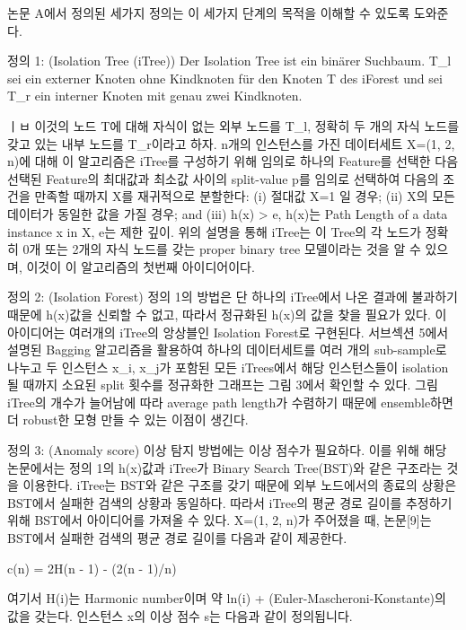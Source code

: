                 논문 A에서 정의된 세가지 정의는 이 세가지 단계의 목적을 이해할 수 있도록 도와준다.

                정의 1: (Isolation Tree (iTree))
                    Der Isolation Tree ist ein binärer Suchbaum. T_l sei ein externer Knoten ohne Kindknoten für den Knoten T des iForest und sei T_r ein interner Knoten mit genau zwei Kindknoten.

                   ㅣㅂ 이것의 노드 T에 대해 자식이 없는 외부 노드를 T_l, 정확히 두 개의 자식 노드를 갖고 있는 내부 노드를 T_r이라고 하자. n개의 인스턴스를 가진 데이터세트 X=(1, 2, n)에 대해 이 알고리즘은 iTree를 구성하기 위해 임의로 하나의 Feature를 선택한 다음 선택된 Feature의 최대값과 최소값 사이의 split-value p를 임의로 선택하여 다음의 조건을 만족할 때까지 X를 재귀적으로 분할한다: (i) 절대값 X=1 일 경우; (ii) X의 모든 데이터가 동일한 값을 가질 경우; and (iii) h(x) > e, h(x)는 Path Length of a data instance x in X, e는 제한 깊이. 위의 설명을 통해 iTree는 이 Tree의 각 노드가 정확히 0개 또는 2개의 자식 노드를 갖는 proper binary tree 모델이라는 것을 알 수 있으며, 이것이 이 알고리즘의 첫번째 아이디어이다.

                정의 2: (Isolation Forest)
                    정의 1의 방법은 단 하나의 iTree에서 나온 결과에 불과하기 때문에 h(x)값을 신뢰할 수 없고, 따라서 정규화된 h(x)의 값을 찾을 필요가 있다. 이 아이디어는 여러개의 iTree의 앙상블인 Isolation Forest로 구현된다. 서브섹션 5에서 설명된 Bagging 알고리즘을 활용하여 하나의 데이터세트를 여러 개의 sub-sample로 나누고 두 인스턴스 x_i, x_j가 포함된 모든 iTrees에서 해당 인스턴스들이 isolation될 때까지 소요된 split 횟수를 정규화한 그래프는 그림 3에서 확인할 수 있다.
                    그림 \cite{Liu08}
                    iTree의 개수가 늘어남에 따라 average path length가 수렴하기 때문에 ensemble하면 더 robust한 모형 만들 수 있는 이점이 생긴다.

                정의 3: (Anomaly score)
                    이상 탐지 방법에는 이상 점수가 필요하다. 이를 위해 해당 논문에서는 정의 1의 h(x)값과 iTree가 Binary Search Tree(BST)와 같은 구조라는 것을 이용한다. iTree는 BST와 같은 구조를 갖기 때문에 외부 노드에서의 종료의 상황은 BST에서 실패한 검색의 상황과 동일하다. 따라서 iTree의 평균 경로 길이를 추정하기 위해 BST에서 아이디어를 가져올 수 있다. X=(1, 2, n)가 주어졌을 때, 논문[9]는 BST에서 실패한 검색의 평균 경로 길이를 다음과 같이 제공한다.
                    
                        c(n) = 2H(n - 1) - (2(n - 1)/n)

                    여기서 H(i)는 Harmonic number이며 약 ln(i) + \gamma (Euler-Mascheroni-Konstante)의 값을 갖는다. 인스턴스 x의 이상 점수 s는 다음과 같이 정의됩니다.

